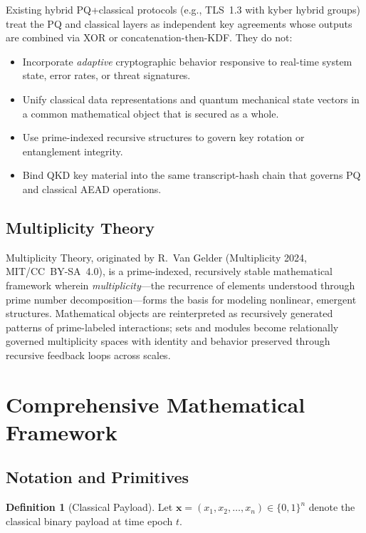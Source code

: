 \documentclass[12pt,letterpaper]{article}
\theoremstyle{plain}
\theoremstyle{definition}
\newtheorem{definition}[theorem]{Definition}
\begin{document}
Existing hybrid PQ+classical protocols (e.g., TLS~1.3 with kyber hybrid
groups) treat the PQ and classical layers as independent key agreements whose
outputs are combined via XOR or concatenation-then-KDF. They do not:
\begin{itemize}[leftmargin=2em]
  \item Incorporate \emph{adaptive} cryptographic behavior responsive to
    real-time system state, error rates, or threat signatures.
  \item Unify classical data representations and quantum mechanical state
    vectors in a common mathematical object that is secured as a whole.
  \item Use prime-indexed recursive structures to govern key rotation or
    entanglement integrity.
  \item Bind QKD key material into the same transcript-hash chain that governs
    PQ and classical AEAD operations.
\end{itemize}

\subsection{Multiplicity Theory}

Multiplicity Theory, originated by R.\ Van Gelder (Multiplicity 2024,
MIT/CC~BY-SA~4.0), is a prime-indexed, recursively stable mathematical
framework wherein \emph{multiplicity}---the recurrence of elements understood
through prime number decomposition---forms the basis for modeling nonlinear,
emergent structures. Mathematical objects are reinterpreted as recursively
generated patterns of prime-labeled interactions; sets and modules become
relationally governed multiplicity spaces with identity and behavior preserved
through recursive feedback loops across scales.

\section{Comprehensive Mathematical Framework}
\label{sec:math}

\subsection{Notation and Primitives}

\begin{definition}[Classical Payload]
Let $\mathbf{x} = (x_1, x_2, \ldots, x_n) \in \{0,1\}^n$ denote the classical
binary payload at time epoch $t$.
\end{definition}
\end{document}
